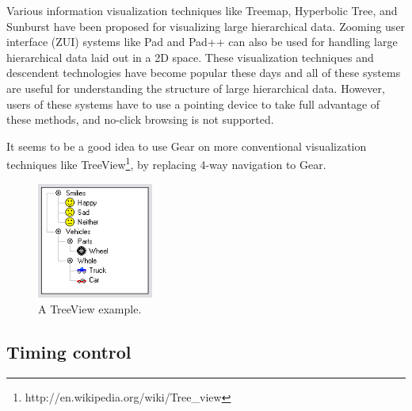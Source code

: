 \documentclass[conference]{IEEEtran}
\begin{document}
Various information visualization techniques like
Treemap\cite{Johnson:1991:TSA:949607.949654},
Hyperbolic Tree\cite{Lamping:1995:FTB:223904.223956},
and Sunburst\cite{Stasko:2000:FDN:857190.857683}
have been proposed for visualizing large hierarchical data.
Zooming user interface (ZUI) systems like
Pad\cite{Perlin:1993:PAA:166117.166125} and
Pad++\cite{Bederson:1994:PZG:192426.192435}
can also be used for handling large hierarchical data laid out in a 2D space.
%
These visualization techniques and descendent technologies have become popular these days and
all of these systems are useful for understanding the structure of
large hierarchical data.
However, users of these systems have to use a pointing device
to take full advantage of these methods, and
no-click browsing is not supported.



It seems to be a good idea to use Gear on more conventional visualization techniques like
TreeView\footnote{
  \textsf{http://en.wikipedia.org/wiki/Tree\_view}
}, by replacing 4-way navigation to Gear.

\begin{figure}[H]
\centerline{
  \includegraphics[width=38mm,bb=0 0 188 188]{figures/treeview.png}
}
\caption{A TreeView example.}
\label{treeview}
\end{figure}


\subsection{Timing control}
\end{document}

